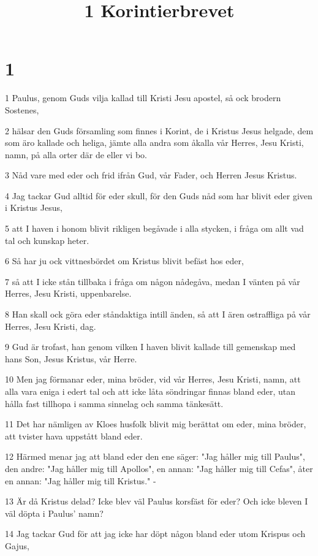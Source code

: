 

\title{1 Korintierbrevet}


\chapter{1}

\par 1 Paulus, genom Guds vilja kallad till Kristi Jesu apostel, så ock brodern Sostenes,
\par 2 hälsar den Guds församling som finnes i Korint, de i Kristus Jesus helgade, dem som äro kallade och heliga, jämte alla andra som åkalla vår Herres, Jesu Kristi, namn, på alla orter där de eller vi bo.
\par 3 Nåd vare med eder och frid ifrån Gud, vår Fader, och Herren Jesus Kristus.
\par 4 Jag tackar Gud alltid för eder skull, för den Guds nåd som har blivit eder given i Kristus Jesus,
\par 5 att I haven i honom blivit rikligen begåvade i alla stycken, i fråga om allt vad tal och kunskap heter.
\par 6 Så har ju ock vittnesbördet om Kristus blivit befäst hos eder,
\par 7 så att I icke stån tillbaka i fråga om någon nådegåva, medan I vänten på vår Herres, Jesu Kristi, uppenbarelse.
\par 8 Han skall ock göra eder ståndaktiga intill änden, så att I ären ostraffliga på vår Herres, Jesu Kristi, dag.
\par 9 Gud är trofast, han genom vilken I haven blivit kallade till gemenskap med hans Son, Jesus Kristus, vår Herre.
\par 10 Men jag förmanar eder, mina bröder, vid vår Herres, Jesu Kristi, namn, att alla vara eniga i edert tal och att icke låta söndringar finnas bland eder, utan hålla fast tillhopa i samma sinnelag och samma tänkesätt.
\par 11 Det har nämligen av Kloes husfolk blivit mig berättat om eder, mina bröder, att tvister hava uppstått bland eder.
\par 12 Härmed menar jag att bland eder den ene säger: "Jag håller mig till Paulus", den andre: "Jag håller mig till Apollos", en annan: "Jag håller mig till Cefas", åter en annan: "Jag håller mig till Kristus." -
\par 13 Är då Kristus delad? Icke blev väl Paulus korsfäst för eder? Och icke bleven I väl döpta i Paulus' namn?
\par 14 Jag tackar Gud för att jag icke har döpt någon bland eder utom Krispus och Gajus,

